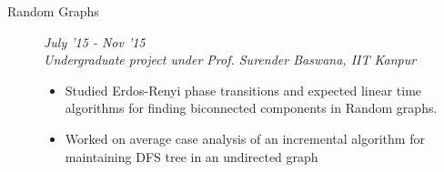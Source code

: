 \documentclass[9pt]{article}
\newenvironment{changemargin}[2]{%
  \begin{list}{}{%
    \setlength{\topsep}{0pt}%
    \setlength{\leftmargin}{#1}%
    \setlength{\rightmargin}{#2}%
    \setlength{\listparindent}{\parindent}%
    \setlength{\itemindent}{\parindent}%
    \setlength{\parsep}{\parskip}%
  }%
  \item[]}{\end{list}
}
\newenvironment{body} {
	\vspace*{-16pt}
	\begin{changemargin}{-0.6in}{-0.65in}
  }	
	{\end{changemargin}
}
\begin{document}
\begin{body}
\begin{description}


	  \item[\normalsize{Random Graphs}]	\hfill 	\textit{July '15 - Nov '15} \\
            \textit{Undergraduate project under Prof. Surender Baswana, IIT Kanpur} 
            \hfill %
	  \begin{itemize}
	   \item Studied Erdos-Renyi phase transitions and expected linear time algorithms for finding 
                biconnected components in Random graphs.
	   \item Worked on average case analysis of an incremental algorithm for maintaining DFS tree in an undirected graph 
	  \end{itemize}
	  

\end{description}
\end{body}
\end{document}
